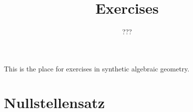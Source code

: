 \documentclass{../util/zariski-small}
\title{Exercises}
\theoremstyle{break}
\begin{document}
\author{???}

\maketitle

This is the place for exercises in synthetic algebraic geometry.

\section{Nullstellensatz}


\printbibliography
\end{document}
